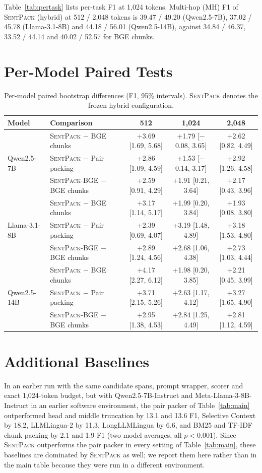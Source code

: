 \documentclass[11pt]{article}
\newcommand{\spk}{\textsc{SentPack}}
\begin{document}
Table~\ref{tab:pertask} lists per-task F1 at 1,024 tokens. Multi-hop (MH) F1 of \spk{} (hybrid) at 512 / 2,048 tokens is 39.47 / 49.20 (Qwen2.5-7B), 37.02 / 45.78 (Llama-3.1-8B) and 44.18 / 56.01 (Qwen2.5-14B), against 34.84 / 46.37, 33.52 / 44.14 and 40.02 / 52.57 for BGE chunks.

\section{Per-Model Paired Tests}
\label{app:permodel}

\begin{table}[t]
\centering
\small
\begin{tabular}{llccc}
\toprule
Model & Comparison & 512 & 1,024 & 2,048 \\
\midrule
\multirow{3}{*}{Qwen2.5-7B}
 & \spk{} $-$ BGE chunks & +3.69 [1.69, 5.68] & +1.79 [$-$0.08, 3.65] & +2.62 [0.82, 4.49] \\
 & \spk{} $-$ Pair packing & +2.86 [1.09, 4.59] & +1.53 [$-$0.14, 3.17] & +2.92 [1.26, 4.58] \\
 & \spk{}-BGE $-$ BGE chunks & +2.59 [0.91, 4.29] & +1.91 [0.21, 3.64] & +2.17 [0.43, 3.96] \\
\midrule
\multirow{3}{*}{Llama-3.1-8B}
 & \spk{} $-$ BGE chunks & +3.17 [1.14, 5.17] & +1.99 [0.20, 3.84] & +1.93 [0.08, 3.80] \\
 & \spk{} $-$ Pair packing & +2.39 [0.69, 4.07] & +3.19 [1.48, 4.89] & +3.18 [1.53, 4.80] \\
 & \spk{}-BGE $-$ BGE chunks & +2.89 [1.24, 4.56] & +2.68 [1.06, 4.38] & +2.73 [1.03, 4.44] \\
\midrule
\multirow{3}{*}{Qwen2.5-14B}
 & \spk{} $-$ BGE chunks & +4.17 [2.27, 6.12] & +1.98 [0.20, 3.85] & +2.21 [0.45, 3.99] \\
 & \spk{} $-$ Pair packing & +3.71 [2.15, 5.26] & +2.63 [1.17, 4.12] & +3.27 [1.65, 4.90] \\
 & \spk{}-BGE $-$ BGE chunks & +2.95 [1.38, 4.53] & +2.84 [1.25, 4.49] & +2.81 [1.12, 4.59] \\
\bottomrule
\end{tabular}
\caption{Per-model paired bootstrap differences (F1, 95\% intervals). \spk{} denotes the frozen hybrid configuration.}
\label{tab:permodel}
\end{table}

\section{Additional Baselines}
\label{app:extra}
In an earlier run with the same candidate spans, prompt wrapper, scorer and exact 1,024-token budget, but with Qwen2.5-7B-Instruct and Meta-Llama-3-8B-Instruct in an earlier software environment, the pair packer of Table~\ref{tab:main} outperformed head and middle truncation by 13.1 and 13.6 F1, Selective Context by 18.2, LLMLingua-2 by 11.3, LongLLMLingua by 6.6, and BM25 and TF-IDF chunk packing by 2.1 and 1.9 F1 (two-model averages, all $p<0.001$). Since \spk{} outperforms the pair packer in every setting of Table~\ref{tab:main}, these baselines are dominated by \spk{} as well; we report them here rather than in the main table because they were run in a different environment.
\end{document}
